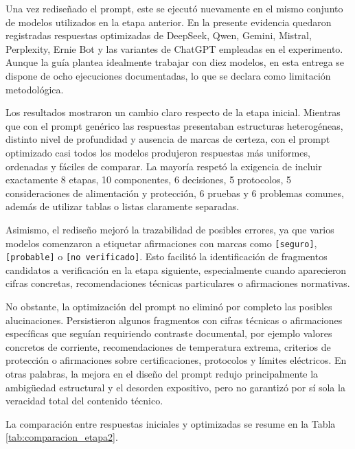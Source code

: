\documentclass[11pt,a4paper]{article}
\begin{document}
Una vez rediseñado el prompt, este se ejecutó nuevamente en el mismo conjunto de modelos utilizados en la etapa anterior. En la presente evidencia quedaron registradas respuestas optimizadas de DeepSeek, Qwen, Gemini, Mistral, Perplexity, Ernie Bot y las variantes de ChatGPT empleadas en el experimento. Aunque la guía plantea idealmente trabajar con diez modelos, en esta entrega se dispone de ocho ejecuciones documentadas, lo que se declara como limitación metodológica.

Los resultados mostraron un cambio claro respecto de la etapa inicial. Mientras que con el prompt genérico las respuestas presentaban estructuras heterogéneas, distinto nivel de profundidad y ausencia de marcas de certeza, con el prompt optimizado casi todos los modelos produjeron respuestas más uniformes, ordenadas y fáciles de comparar. La mayoría respetó la exigencia de incluir exactamente 8 etapas, 10 componentes, 6 decisiones, 5 protocolos, 5 consideraciones de alimentación y protección, 6 pruebas y 6 problemas comunes, además de utilizar tablas o listas claramente separadas.

Asimismo, el rediseño mejoró la trazabilidad de posibles errores, ya que varios modelos comenzaron a etiquetar afirmaciones con marcas como \texttt{[seguro]}, \texttt{[probable]} o \texttt{[no verificado]}. Esto facilitó la identificación de fragmentos candidatos a verificación en la etapa siguiente, especialmente cuando aparecieron cifras concretas, recomendaciones técnicas particulares o afirmaciones normativas.

No obstante, la optimización del prompt no eliminó por completo las posibles alucinaciones. Persistieron algunos fragmentos con cifras técnicas o afirmaciones específicas que seguían requiriendo contraste documental, por ejemplo valores concretos de corriente, recomendaciones de temperatura extrema, criterios de protección o afirmaciones sobre certificaciones, protocolos y límites eléctricos. En otras palabras, la mejora en el diseño del prompt redujo principalmente la ambigüedad estructural y el desorden expositivo, pero no garantizó por sí sola la veracidad total del contenido técnico.

La comparación entre respuestas iniciales y optimizadas se resume en la Tabla \ref{tab:comparacion_etapa2}.
\end{document}
